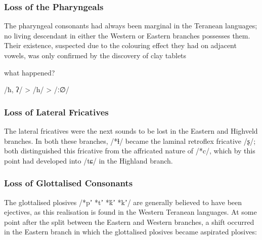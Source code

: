 \documentclass[grammar]{subfiles}
\begin{document}
\subsubsection{Loss of the Pharyngeals}
\label{sssec:history:east:pharyngeals}

The pharyngeal consonants had always been marginal in the Teranean languages;
no living descendant in either the Western or Eastern branches possesses them.
Their existence, suspected due to the colouring effect they had on adjacent
vowels, was only confirmed by the discovery of clay tablets \tbw

\Tbw what happened?

/ħ, ʔ/ > /h/ > /ː∅/

\subsubsection{Loss of Lateral Fricatives}
\label{sssec:history:east:lateral}

The lateral fricatives were the next sounds to be lost in the Eastern and
Highveld branches.  In both these branches, /*ɬ/ became the laminal retroflex
fricative /ʂ/; both distinguished this fricative from the affricated nature of
/*c/, which by this point had developed into /tɕ/ in the Highland branch.

%
%


\subsubsection{Loss of Glottalised Consonants}
\label{sssec:history:east:glottalised}

The glottalised plosives /*pʼ *tʼ *ḱʼ *kʼ/ are generally believed to have been
ejectives, as this realisation is found in the Western Teranean languages.  At
some point after the split between the Eastern and Western branches, a shift
occurred in the Eastern branch in which the glottalised plosives became
aspirated plosives:
\end{document}
